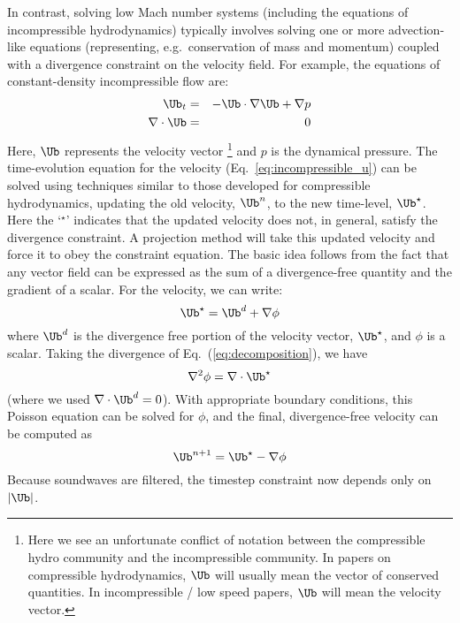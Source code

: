 In contrast, solving low Mach number systems (including the equations of
incompressible hydrodynamics) typically involves solving one or more
advection-like equations (representing, e.g.\ conservation of mass and
momentum) coupled with a divergence constraint on the velocity field.
For example, the equations of constant-density incompressible flow
are:
\begin{eqnarray}
\Ub_t &=& -\Ub \cdot \nabla \Ub + \nabla p \label{eq:incompressible_u} \\
\nabla \cdot \Ub &=& 0
\end{eqnarray}
Here, $\Ub$ represents the velocity vector%
%
\footnote{Here we see an unfortunate conflict
of notation between the compressible hydro community and the
incompressible community.  In papers on compressible hydrodynamics,
$\Ub$ will usually mean the vector of conserved quantities.  In 
incompressible / low speed papers, $\Ub$ will mean the velocity vector.}
%
and $p$ is the dynamical pressure.  The time-evolution equation for
the velocity (Eq.~\ref{eq:incompressible_u}) can be solved using
techniques similar to those developed for compressible hydrodynamics,
updating the old velocity, $\Ub^n$, to the new time-level, $\Ub^\star$.
Here the `$^\star$' indicates that the updated velocity does not, in
general, satisfy the divergence constraint.  A projection method will
take this updated velocity and force it to obey the constraint
equation.  The basic idea follows from the fact that any vector
field can be expressed as the sum of a divergence-free quantity and
the gradient of a scalar.  For the velocity, we can write:
\begin{equation}
\Ub^\star = \Ub^d + \nabla \phi \label{eq:decomposition}
\end{equation}
where $\Ub^d$ is the divergence free portion of the velocity vector,
$\Ub^\star$, and $\phi$ is a scalar.  Taking the divergence of
Eq.~(\ref{eq:decomposition}), we have
\begin{equation}
\nabla^2 \phi = \nabla \cdot \Ub^\star
\end{equation}
(where we used $\nabla \cdot \Ub^d = 0$).
With appropriate boundary conditions, this Poisson equation can be
solved for $\phi$, and the final, divergence-free velocity can 
be computed as
\begin{equation}
\Ub^{n+1} = \Ub^\star - \nabla \phi
\end{equation}
Because soundwaves are filtered, the timestep constraint now depends only
on $|\Ub|$.

